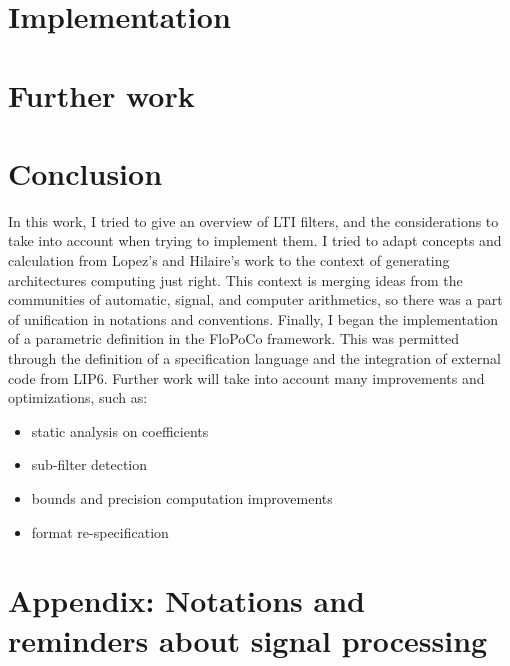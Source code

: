 \documentclass[twoside]{article}
\theoremstyle{remark}
\numberwithin{equation}{subsection}
\newcommand{\TODO}{\textbf{TODO}}
\begin{document}
\newpage
\section{Implementation}
\label{Part2}


\newpage
\section{Further work}
\label{Part3}


\section*{Conclusion}
	In this work, I tried to give an overview of LTI filters, and the considerations to take into account when trying to implement them.
	I tried to adapt concepts and calculation from Lopez's and Hilaire's work to the context of generating architectures computing just right.
	This context is merging ideas from the communities of automatic, signal, and computer arithmetics, so there was a part of unification in notations and conventions.
	Finally, I began the implementation of a parametric definition in the FloPoCo framework.
	This was permitted through the definition of a specification language and the integration of external code from LIP6.
	Further work will take into account many improvements and optimizations, such as:
	\begin{itemize}
		\item static analysis on coefficients
		\item sub-filter detection
		\item bounds and precision computation improvements
		\item format re-specification
	\end{itemize}


\newpage
\section*{Appendix: Notations and reminders about signal processing}

\end{document}
